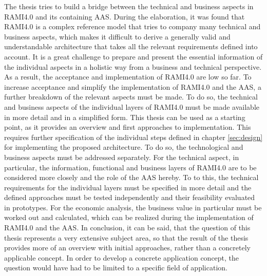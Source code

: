 The thesis tries to build a bridge between the technical and business aspects in \ac{RAMI4.0} and its containing \ac{AAS}. During the elaboration, it was found that \ac{RAMI4.0} is a complex reference model that tries to company many technical and business aspects, which makes it difficult to derive a generally valid and understandable architecture that takes all the relevant requirements defined into account. It is a great challenge to prepare and present the essential information of the individual aspects in a holistic way from a business and technical perspective. As a result, the acceptance and implementation of \ac{RAMI4.0} are low so far. To increase acceptance and simplify the implementation of \ac{RAMI4.0} and the \ac{AAS}, a further breakdown of the relevant aspects must be made. To do so, the technical and business aspects of the individual layers of \ac{RAMI4.0} must be made available in more detail and in a simplified form. This thesis can be used as a starting point, as it provides an overview and first approaches to implementation. This requires further specification of the individual steps defined in chapter \ref{sec:design} for implementing the proposed architecture. To do so, the technological and business aspects must be addressed separately. For the technical aspect,  in particular, the information, functional and business layers of \ac{RAMI4.0} are to be considered more closely and the role of the \ac{AAS} hereby. To to this, the technical requirements for the individual layers must be specified in more detail and the defined approaches must be tested independently and their feasibility evaluated in prototypes. For the economic analysis, the business value in particular must be worked out and calculated, which can be realized during the implementation of \ac{RAMI4.0} and the \ac{AAS}. In conclusion, it can be said, that the question of this thesis represents a very extensive subject area, so that the result of the thesis provides more of an overview with initial approaches, rather than a concretely applicable concept. In order to develop a concrete application concept, the question would have had to be limited to a specific field of application.